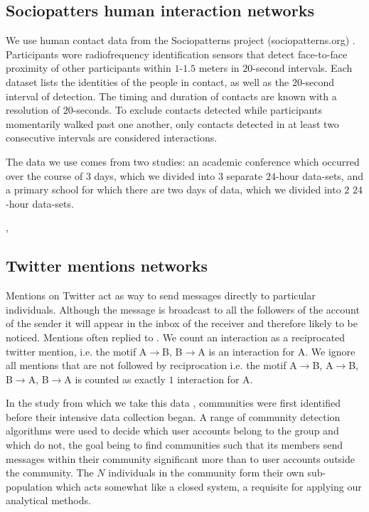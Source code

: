 \documentclass[10pt]{article}
\begin{document}
\begin{multicols}{2}
\subsection{Sociopatters human interaction networks}
We use human contact data from the Sociopatterns project (sociopatterns.org) \cite{isella2011s,10.1371/journal.pone.0073970,10.1371/journal.pone.0023176}. Participants wore radiofrequency identification sensors that detect face-to-face proximity of other participants within $1$-$1.5$ meters in $20$-second intervals. Each dataset lists the identities of the people in contact, as well as the $20$-second interval of detection. The timing and duration of contacts are known with a resolution of $20$-seconds. To exclude contacts detected while participants momentarily walked past one another, only contacts detected in at least two consecutive intervals are considered interactions.

The data we use comes from two studies: an academic conference which occurred over the course of $3$ days, which we divided into $3$ separate $24$-hour data-sets, and a primary school for which there are two days of data, which we divided into $2$ $24$-hour data-sets. 

\cite{isella2011s},\cite{10.1371/journal.pone.0023176}
\subsection{Twitter mentions networks}
Mentions on Twitter act as way to send messages directly to particular individuals. Although the message is broadcast to all the followers of the  account of the sender it will appear in the inbox of the receiver and therefore likely to be noticed. Mentions often replied to \cite{10.1371/journal.pone.0022656}. We count an interaction as a reciprocated twitter mention, i.e. the motif A$\rightarrow$B, B$\rightarrow$A is an  interaction for A. We ignore all mentions that are not followed by reciprocation i.e. the motif A$\rightarrow$B, A$\rightarrow$B, B$\rightarrow$A, B$\rightarrow$A is counted as exactly $1$ interaction for A.

In the study from which we take this data \cite{Charlton160162}, communities were first identified before their intensive data collection began. A range of community detection algorithms were used to decide which user accounts belong to the group and which do not, the goal being to find communities such that its members send messages within their community significant more than to user accounts outside the community. The $N$ individuals in the community form their own sub-population which acts somewhat like a closed system, a requisite for applying our analytical methods. 


\end{multicols}
\end{document}
